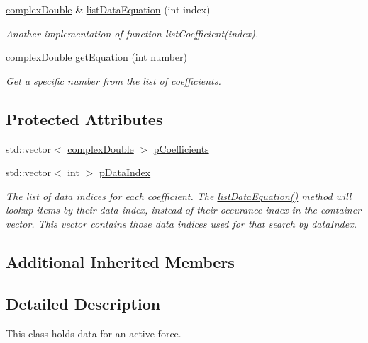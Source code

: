 \begin{DoxyCompactItemize}
\hyperlink{namespaceosea_1_1ofreq_a40cad4695a41123a7ae6ab0b6e8b1664}{complex\-Double} \& \hyperlink{classosea_1_1ofreq_1_1_force_active_aa05812dcc8b83df534134888015f75e6}{list\-Data\-Equation} (int index)
\begin{DoxyCompactList}\small\item\em Another implementation of function list\-Coefficient(index). \end{DoxyCompactList}\item 
\hyperlink{namespaceosea_1_1ofreq_a40cad4695a41123a7ae6ab0b6e8b1664}{complex\-Double} \hyperlink{classosea_1_1ofreq_1_1_force_active_a2e01f54c3071d2f8831fb7763cf14500}{get\-Equation} (int number)
\begin{DoxyCompactList}\small\item\em Get a specific number from the list of coefficients. \end{DoxyCompactList}\end{DoxyCompactItemize}
\subsection*{Protected Attributes}
\begin{DoxyCompactItemize}
\item 
std\-::vector$<$ \hyperlink{namespaceosea_1_1ofreq_a40cad4695a41123a7ae6ab0b6e8b1664}{complex\-Double} $>$ \hyperlink{classosea_1_1ofreq_1_1_force_active_af5731f3a699256f0b0b61b77701b236a}{p\-Coefficients}
\item 
std\-::vector$<$ int $>$ \hyperlink{classosea_1_1ofreq_1_1_force_active_a5fe90d49624efff55c2cc641f394f8f4}{p\-Data\-Index}
\begin{DoxyCompactList}\small\item\em The list of data indices for each coefficient. The \hyperlink{classosea_1_1ofreq_1_1_force_active_a6c41c64d60a90442ab2caffcefe703f1}{list\-Data\-Equation()} method will lookup items by their data index, instead of their occurance index in the container vector. This vector contains those data indices used for that search by data\-Index. \end{DoxyCompactList}\end{DoxyCompactItemize}
\subsection*{Additional Inherited Members}


\subsection{Detailed Description}
This class holds data for an active force. 

